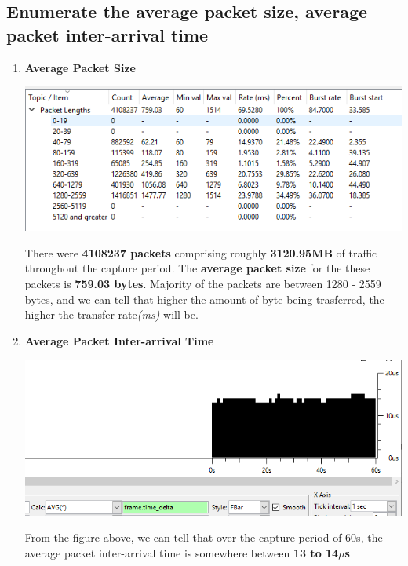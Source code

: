 \documentclass[a4paper,11pt]{article}
\begin{document}
\subsection{Enumerate the average packet size, average packet inter-arrival time }
\begin{enumerate}
	\item \textbf{Average Packet Size}
	\newline\newline
	\begin{minipage}{5in}
	\centering
		\includegraphics[width = 16cm]{avgpacketsize}
		\captionsetup{justification=centering}
	\end{minipage}
	\newline\newline
	There were \textbf{4108237 packets} comprising roughly \textbf{3120.95MB} of traffic throughout the capture period. The \textbf{average packet size} for the these packets is \textbf{759.03 bytes}. Majority of the packets are between 1280 - 2559 bytes, and we can tell that higher the amount of byte being trasferred, the higher the transfer rate\textit{(ms)} will be.
	\newline\newline
	\item \textbf{Average Packet Inter-arrival Time}
	\newline\newline
	\begin{minipage}{5in}
	\centering
		\includegraphics[width = 16cm]{interarrivaltime}
		\captionsetup{justification=centering}
	\end{minipage}
	\newline\newline
	From the figure above, we can tell that over the capture period of 60s, the average packet inter-arrival time is somewhere between \textbf{13 to 14$\mu$s} 
\end{enumerate}
\end{document}
